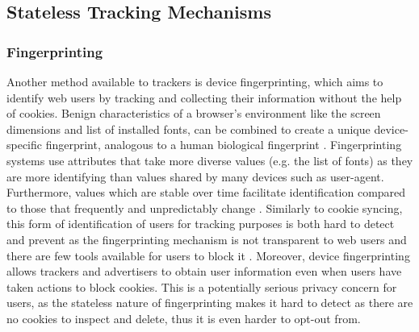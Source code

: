 \documentclass[12pt]{article}
\begin{document}
\subsection{Stateless Tracking Mechanisms}
    
\subsubsection{Fingerprinting} \label{fingerprinting}
Another method available to trackers is device fingerprinting, which aims to identify web users by tracking and collecting their information without the help of cookies. Benign characteristics of a browser's environment like the screen dimensions and list of installed fonts, can be combined to create a unique device-specific fingerprint, analogous to a human biological fingerprint \parencite{uniqueBrowser}. Fingerprinting systems use attributes that take more diverse values (e.g. the list of fonts) as they are more identifying than values shared by many devices such as user-agent. Furthermore, values which are stable over time facilitate identification compared to those that frequently and unpredictably change \parencite{dustingFP}. Similarly to cookie syncing, this form of identification of users for tracking purposes is both hard to detect and prevent as the fingerprinting mechanism is not transparent to web users and there are few tools available for users to block it \parencite{uniqueBrowser}. Moreover, device fingerprinting allows trackers and advertisers to obtain user information even when  users have taken actions to block cookies. This is a potentially serious privacy concern for users, as the stateless nature of fingerprinting makes it hard to detect as there are no cookies to inspect and delete, thus it is even harder to opt-out from. \newline 
\end{document}

